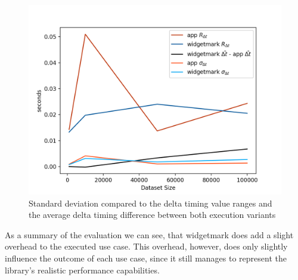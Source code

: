 \begin{figure}[h]
    \centering
    \includegraphics[width=12cm]{resources/img/evaluation/Eval_STD}
    \caption{Standard deviation compared to the delta timing value ranges and
        the average delta timing difference between both execution variants}
    \label{fig:evaluation:std}
\end{figure}

As a summary of the evaluation we can see, that widgetmark does add a slight
overhead to the executed use case. This overhead, however, does only slightly
influence the outcome of each use case, since it still manages to represent
the library's realistic performance capabilities.
